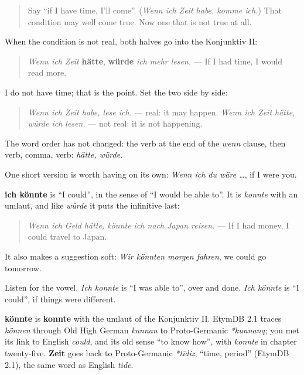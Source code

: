 \begin{quote}
Say \textquotedblleft{}if I have time, I'll come\textquotedblright{}. (\emph{Wenn ich Zeit habe, komme ich.}) That condition may well come true. Now one that is not true at all.
\end{quote}

\begin{grammarlens}[title={Grammar Lens: the Konjunktiv II in both halves}]
When the condition is not real, both halves go into the Konjunktiv II:

\begin{quote}
\emph{Wenn ich Zeit} \textbf{hätte}, \textbf{würde} \emph{ich mehr lesen.} — If I had time, I would read more.
\end{quote}

I do not have time; that is the point. Set the two side by side:

\begin{quote}
\emph{Wenn ich Zeit habe, lese ich.} — real: it may happen. \emph{Wenn ich Zeit hätte, würde ich lesen.} — not real: it is not happening.
\end{quote}

The word order has not changed: the verb at the end of the \emph{wenn} clause, then verb, comma, verb: \emph{hätte, würde}.

One short version is worth having on its own: \emph{Wenn ich du wäre …}, if I were you.
\end{grammarlens}

\begin{culture}
\textbf{ich könnte} is \textquotedblleft{}I could\textquotedblright{}, in the sense of \textquotedblleft{}I would be able to\textquotedblright{}. It is \emph{konnte} with an umlaut, and like \emph{würde} it puts the infinitive last:

\begin{quote}
\emph{Wenn ich Geld hätte, könnte ich nach Japan reisen.} — If I had money, I could travel to Japan.
\end{quote}

It also makes a suggestion soft: \emph{Wir könnten morgen fahren}, we could go tomorrow.

Listen for the vowel. \emph{Ich konnte} is \textquotedblleft{}I was able to\textquotedblright{}, over and done. \emph{Ich könnte} is \textquotedblleft{}I could\textquotedblright{}, if things were different.
\end{culture}

\begin{cousinweb}
\textbf{könnte} is \textbf{konnte} with the umlaut of the Konjunktiv II. EtymDB 2.1 traces \emph{können} through Old High German \emph{kunnan} to Proto-Germanic \emph{*kunnaną}; you met its link to English \emph{could}, and its old sense \textquotedblleft{}to know how\textquotedblright{}, with \emph{konnte} in chapter twenty-five. \textbf{Zeit} goes back to Proto-Germanic \emph{*tīdiz}, \textquotedblleft{}time, period\textquotedblright{} (EtymDB 2.1), the same word as English \emph{tide}.
\end{cousinweb}

